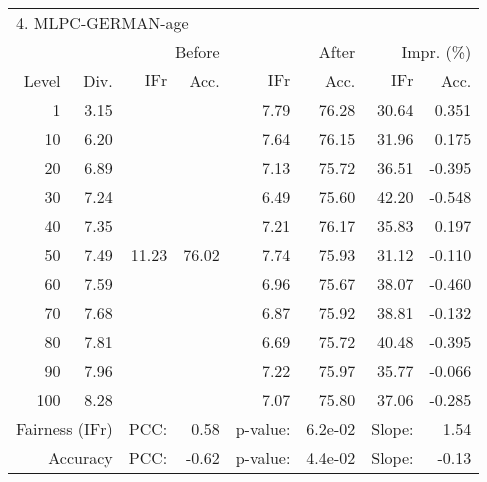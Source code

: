 \begin{tabular}{rr||rr|rr|rr}
\multicolumn{4}{l}{4. MLPC-GERMAN-age} & \multicolumn{2}{c}{} & \multicolumn{2}{c}{}\\
 &  & \multicolumn{2}{r|}{Before} & \multicolumn{2}{r|}{After} & \multicolumn{2}{r}{Impr. (\%)}\\
Level & Div. & $\mathrm{IFr}$ & Acc. & $\mathrm{IFr}$ & Acc. & $\mathrm{IFr}$ & Acc.\\
\hline
1 & 3.15 & \multirow{11}{*}{11.23} & \multirow{11}{*}{76.02} & 7.79 & 76.28 & 30.64 & 0.351\\
10 & 6.20 &  &  & 7.64 & 76.15 & 31.96 & 0.175\\
20 & 6.89 &  &  & 7.13 & 75.72 & 36.51 & -0.395\\
30 & 7.24 &  &  & 6.49 & 75.60 & 42.20 & -0.548\\
40 & 7.35 &  &  & 7.21 & 76.17 & 35.83 & 0.197\\
50 & 7.49 &  &  & 7.74 & 75.93 & 31.12 & -0.110\\
60 & 7.59 &  &  & 6.96 & 75.67 & 38.07 & -0.460\\
70 & 7.68 &  &  & 6.87 & 75.92 & 38.81 & -0.132\\
80 & 7.81 &  &  & 6.69 & 75.72 & 40.48 & -0.395\\
90 & 7.96 &  &  & 7.22 & 75.97 & 35.77 & -0.066\\
100 & 8.28 &  &  & 7.07 & 75.80 & 37.06 & -0.285\\
\hline
\multicolumn{2}{r}{Fairness ($\mathrm{IFr}$)} & PCC: & \multicolumn{1}{r}{0.58} & p-value:  & \multicolumn{1}{r}{6.2e-02} & Slope:  & 1.54\\
\multicolumn{2}{r}{Accuracy} & PCC: & \multicolumn{1}{r}{-0.62} & p-value:  & \multicolumn{1}{r}{4.4e-02} & Slope:  & -0.13\\
\end{tabular}
